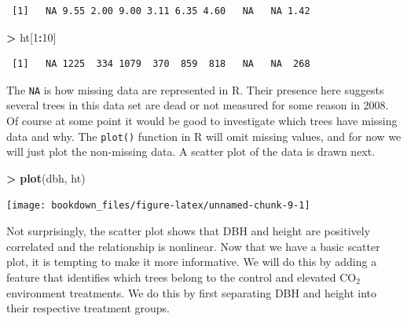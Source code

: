 \documentclass[]{krantz}
\makeatletter
\newenvironment{Shaded}{\begin{snugshade}}{\end{snugshade}}
\newcommand{\KeywordTok}[1]{\textcolor[rgb]{0.27,0.27,0.27}{\textbf{#1}}}
\newcommand{\DecValTok}[1]{\textcolor[rgb]{0.06,0.06,0.06}{#1}}
\newcommand{\StringTok}[1]{\textcolor[rgb]{0.5,0.5,0.5}{#1}}
\newcommand{\OperatorTok}[1]{\textcolor[rgb]{0.43,0.43,0.43}{\textbf{#1}}}
\newcommand{\NormalTok}[1]{#1}
\newenvironment{kframe}{%
\medskip{}
\setlength{\fboxsep}{.8em}
 \def\at@end@of@kframe{}%
 \ifinner\ifhmode%
  \def\at@end@of@kframe{\end{minipage}}%
  \begin{minipage}{\columnwidth}%
 \fi\fi%
 \def\FrameCommand##1{\hskip\@totalleftmargin \hskip-\fboxsep
 \colorbox{shadecolor}{##1}\hskip-\fboxsep
     \hskip-\linewidth \hskip-\@totalleftmargin \hskip\columnwidth}%
 \MakeFramed {\advance\hsize-\width
   \@totalleftmargin\z@ \linewidth\hsize
   \@setminipage}}%
 {\par\unskip\endMakeFramed%
 \at@end@of@kframe}
\renewenvironment{Shaded}{\begin{kframe}}{\end{kframe}}
\theoremstyle{definition}
\theoremstyle{definition}
\theoremstyle{definition}
\theoremstyle{remark}
\makeatother
\begin{document}
\begin{verbatim}
 [1]   NA 9.55 2.00 9.00 3.11 6.35 4.60   NA   NA 1.42
\end{verbatim}

\begin{Shaded}
\begin{Highlighting}[]
\OperatorTok{>}\StringTok{ }\NormalTok{ht[}\DecValTok{1}\OperatorTok{:}\DecValTok{10}\NormalTok{]}
\end{Highlighting}
\end{Shaded}

\begin{verbatim}
 [1]   NA 1225  334 1079  370  859  818   NA   NA  268
\end{verbatim}

The \texttt{NA} is how missing data are represented in R. Their presence
here suggests several trees in this data set are dead or not measured
for some reason in 2008. Of course at some point it would be good to
investigate which trees have missing data and why. The \texttt{plot()}
function in R will omit missing values, and for now we will just plot
the non-missing data. A scatter plot of the data is drawn next.

\begin{Shaded}
\begin{Highlighting}[]
\OperatorTok{>}\StringTok{ }\KeywordTok{plot}\NormalTok{(dbh, ht)}
\end{Highlighting}
\end{Shaded}

\begin{center}\texttt{[image: bookdown\_files/figure-latex/unnamed-chunk-9-1]} \end{center}

Not surprisingly, the scatter plot shows that DBH and height are
positively correlated and the relationship is nonlinear. Now that we
have a basic scatter plot, it is tempting to make it more informative.
We will do this by adding a feature that identifies which trees belong
to the control and elevated CO\(_2\) environment treatments. We do this
by first separating DBH and height into their respective treatment
groups.
\end{document}
